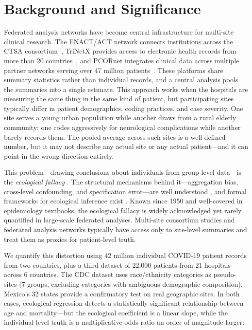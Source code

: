 \documentclass[11pt]{article}
\begin{document}
\section{Background and Significance}

Federated analysis networks have become central infrastructure for
multi-site clinical research.  The ENACT/ACT network connects
institutions across the CTSA consortium~\cite{visweswaran2018act},
TriNetX provides access to electronic health records from more than
20 countries~\cite{trinetx2024}, and PCORnet integrates clinical
data across multiple partner networks serving over 47 million
patients~\cite{fleurence2014pcornet}.  These
platforms share summary statistics rather than individual records,
and a central analysis pools the summaries into a single estimate.
This approach works when the hospitals are measuring the same thing
in the same kind of patient, but participating sites typically differ
in patient demographics, coding practices, and case severity.
One site serves a young urban population while another draws from
a rural elderly community; one codes aggressively for neurological
complications while another barely records them.  The pooled average
across such sites is a well-defined number, but it may not describe
any actual site or any actual patient---and it can point in the wrong
direction entirely.

This problem---drawing conclusions about individuals from group-level
data---is the \emph{ecological fallacy}
\cite{robinson1950ecological}.  The structural mechanisms behind it---aggregation
bias, cross-level confounding, and specification error---are well understood
\cite{greenland1992ecological,greenland2001ecologic}, and formal frameworks
for ecological inference exist \cite{king1997ecological,wakefield2003ecological,wakefield2008ecologic}.
Known since 1950 and well-covered in epidemiology textbooks, the
ecological fallacy is widely acknowledged yet rarely quantified in
large-scale federated analyses.
Multi-site consortium studies and federated analysis networks typically have
access only to site-level summaries and treat them as proxies for
patient-level truth.

We quantify this distortion using 42 million individual COVID-19 patient
records from two countries, plus a third dataset of 22,000 patients from 21
hospitals across 6 countries.  The CDC dataset uses race/ethnicity categories
as pseudo-sites (7 groups, excluding categories with ambiguous demographic
composition).  Mexico's 32 states provide a confirmatory test on real
geographic sites.  In both cases, ecological regression detects a
statistically significant relationship between age and mortality---but the
ecological coefficient is a linear slope, while the individual-level truth
is a multiplicative odds ratio an order of magnitude larger:
\end{document}
